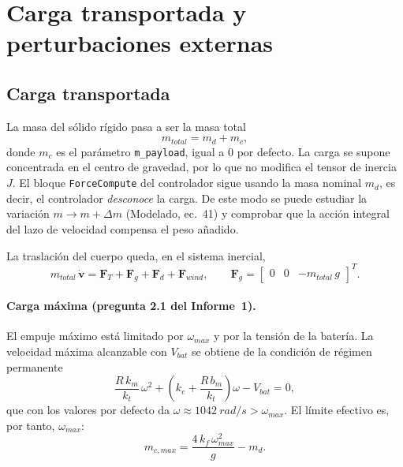\section{Carga transportada y perturbaciones externas}
\label{sec:perturbaciones}

\subsection{Carga transportada}
La masa del sólido rígido pasa a ser la masa total
\begin{equation}
  m_{total} = m_d + m_c ,
\end{equation}
donde $m_c$ es el parámetro \texttt{m\_payload}, igual a $0$ por defecto. La carga se
supone concentrada en el centro de gravedad, por lo que no modifica el tensor de
inercia $J$. El bloque \texttt{ForceCompute} del controlador sigue usando la masa
nominal $m_d$, es decir, el controlador \emph{desconoce} la carga. De este modo se
puede estudiar la variación $m \rightarrow m + \Delta m$ (Modelado, ec.~41) y
comprobar que la acción integral del lazo de velocidad compensa el peso añadido.

La traslación del cuerpo queda, en el sistema inercial,
\begin{equation}
  m_{total}\, \dot{\mathbf{v}} = \mathbf{F}_T + \mathbf{F}_g + \mathbf{F}_d + \mathbf{F}_{wind},
  \qquad
  \mathbf{F}_g = \begin{bmatrix} 0 & 0 & -m_{total}\, g \end{bmatrix}^T .
\end{equation}

\paragraph{Carga máxima (pregunta 2.1 del Informe~1).}
El empuje máximo está limitado por $\omega_{max}$ y por la tensión de la batería. La
velocidad máxima alcanzable con $V_{bat}$ se obtiene de la condición de régimen
permanente
\begin{equation}
  \frac{R\,k_m}{k_t}\,\omega^2 + \left(k_e + \frac{R\,b_m}{k_t}\right)\omega - V_{bat} = 0 ,
\end{equation}
que con los valores por defecto da $\omega \approx \SI{1042}{rad/s} > \omega_{max}$. El
límite efectivo es, por tanto, $\omega_{max}$:
\begin{equation}
  m_{c,max} = \frac{4\,k_f\,\omega_{max}^2}{g} - m_d .
\end{equation}

